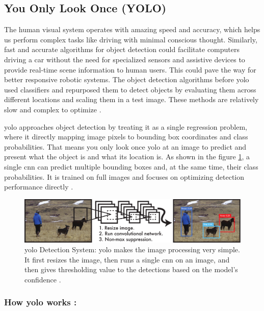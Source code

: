 \subsection{You Only Look Once (YOLO)}
\label{subsec:yolo}

The human visual system operates with amazing speed and accuracy, which helps us perform complex tasks like driving with minimal conscious thought. Similarly, fast and accurate algorithms for object detection could facilitate computers driving a car without the need for specialized sensors and assistive devices to provide real-time scene information to human users. This could pave the way for better responsive robotic systems. The object detection algorithms before \gls{yolo} used classifiers and repurposed them to detect objects by evaluating them across different locations and scaling them in a test image. These methods are relatively slow and complex to optimize \cite{redmon2016you}.

\gls{yolo} approaches object detection by treating it as a single regression problem, where it directly mapping image pixels to bounding box coordinates and class probabilities. That means you only look once \gls{yolo} at an image to predict and present what the object is and what its location is. As shown in the figure \ref{fig:yolo system}, a single \gls{cnn} can predict multiple bounding boxes and, at the same time, their class probabilities. It is trained on full images and focuses on optimizing detection performance directly \cite{redmon2016you}.

\begin{figure}[H]
    \centering
    \includegraphics[width=1\linewidth]{Rohit_Master_Thesis//Images/yolo_system.pdf}
    \caption{\gls{yolo} Detection System: \gls{yolo} makes the image processing very simple. It first resizes the image, then runs a single \gls{cnn} on an image, and then gives thresholding value to the detections based on the model's confidence \cite{redmon2016you}.}
    \label{fig:yolo system}
\end{figure}


\subsubsection*{ How \gls{yolo} works :}

